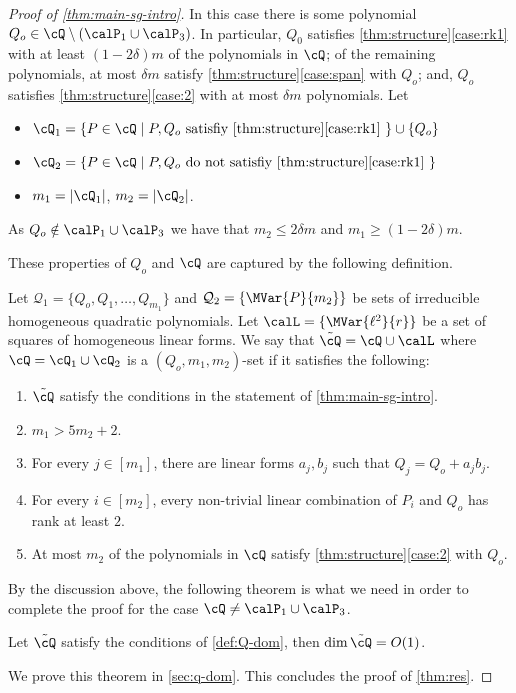 \begin{proof}[Proof of \autoref{thm:main-sg-intro}]
In this case there is some polynomial $Q_o \in \cQ \setminus ({\calP}_1\cup {\calP}_3)$. In particular,  $Q_0$ satisfies \autoref{thm:structure}\ref{case:rk1} with at least $(1-2\delta)m$ of the polynomials in $\cQ$; of the remaining polynomials, at most $\delta m$ satisfy \autoref{thm:structure}\ref{case:span} with $Q_o$; 
and, $Q_o$ satisfies \autoref{thm:structure}\ref{case:2} with at most $\delta m$ polynomials.
 Let 
\begin{itemize}
\item $\cQ_1 =  \{P \in \cQ \mid P,Q_o \text{ satisfiy \autoref{thm:structure}\ref{case:rk1} }\} \cup \{Q_o\}$
\item $\cQ_2 = \{P \in \cQ \mid P,Q_o \text{ do not satisfiy \autoref{thm:structure}\ref{case:rk1} }\}$ 
\item $m_1 = |\cQ_1|$, $m_2 = |\cQ_2|$.
\end{itemize}
As $Q_o \notin \calP_1 \cup \calP_3$ we have that $m_2 \leq 2\delta m$ and $m_1 \geq (1-2\delta)m$.

These properties of $Q_o$ and $\cQ$ are captured by the following definition.

\begin{definition}\label{def:Q-dom}
Let  $\mathcal{Q}_1 = \{Q_o,Q_1,\ldots,Q_{m_1}\}$ and $\mathcal{Q}_2 = \{\MVar{P}{m_2}\}$ be sets of irreducible homogeneous quadratic polynomials. Let $\calL = \{\MVar{\ell^2}{r}\}$ be a set of squares of homogeneous linear forms. We say that $\tilde{\cQ} = \cQ \cup \calL$ where $\cQ=\cQ_1\cup\cQ_2$ is a {$(Q_o,m_1,m_2)$-set} if it satisfies the following:
\begin{enumerate}
\item $\tilde{\cQ}$ satisfy the conditions in the statement of \autoref{thm:main-sg-intro}.
\item $m_1 > 5m_2+2$.

\item For every $j\in [m_1]$, there are  linear forms $a_j,b_j$ such that  $Q_j = Q_o + a_j b_j$.
\item For every $i\in [m_2]$, every non-trivial linear combination of $P_i$ and $Q_o$ has rank at least $2$.\label{item:Qdom>2}
\item At most $m_2$ of the polynomials in $\cQ$  satisfy \autoref{thm:structure}\ref{case:2} with $Q_o$. \label{item:Qdom-case3}
\end{enumerate}
\end{definition}

By the discussion above, the following theorem is what we need in order to complete the proof for the case   $\cQ\neq\calP_1\cup\calP_3$.

\begin{theorem}\label{thm:Q-dom-gen}
Let $\tilde{\cQ}$ satisfy the conditions of \autoref{def:Q-dom}, then $\dim{\tilde{\cQ}} = O(1)$.
\end{theorem}

We prove this theorem in \autoref{sec:q-dom}. This concludes the proof of \autoref{thm:res}. 
\end{proof}


